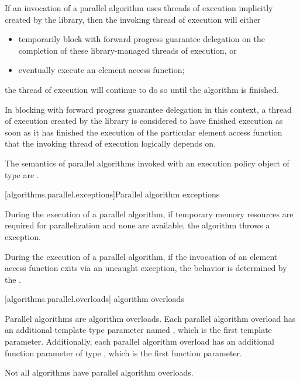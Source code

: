 \pnum
If an invocation of a parallel algorithm uses threads of execution implicitly
created by the library, then the invoking thread of execution will either

\begin{itemize}
\item temporarily block with forward progress guarantee delegation
      on the completion of these library-managed threads of execution, or
\item eventually execute an element access function;
\end{itemize}

the thread of execution will continue to do so until the algorithm is finished.
\begin{note}
In blocking with forward progress guarantee delegation in this context,
a thread of execution created by the library is considered to have
finished execution as soon as it has finished the execution of the
particular element access function that the invoking thread of execution
logically depends on.
\end{note}

\pnum
The semantics of parallel algorithms invoked with an execution policy object of
 type are
.

[algorithms.parallel.exceptions]{Parallel algorithm exceptions}

\pnum
During the execution of a parallel algorithm, if temporary memory resources are
required for parallelization and none are available, the algorithm throws a
 exception.

\pnum
During the execution of a parallel algorithm, if the invocation of an element
access function exits via an uncaught exception,
the behavior is determined by the .

[algorithms.parallel.overloads]{ algorithm overloads}

\pnum
Parallel algorithms are algorithm overloads. Each parallel algorithm overload
has an additional template type parameter named , which
is the first template parameter.
Additionally, each parallel algorithm overload has an additional function
parameter of type , which is the first
function parameter.
\begin{note} Not all algorithms have parallel algorithm overloads.\end{note}

